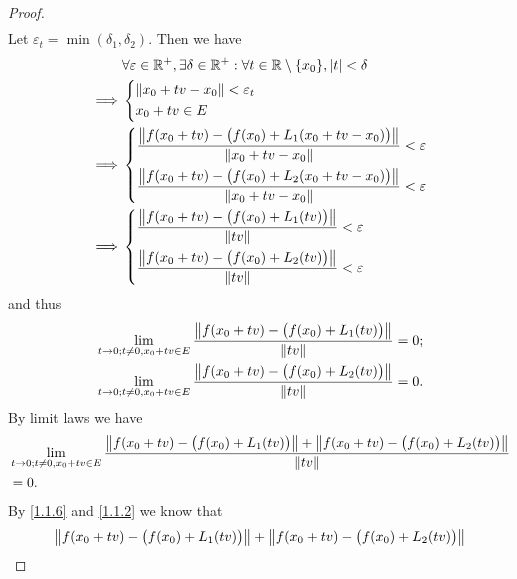 \begin{proof}
\begin{align*}
  \end{align*}
  Let \(\varepsilon_t = \min(\delta_1, \delta_2)\).
  Then we have
  \begin{align*}
             & \forall \varepsilon \in \R^+, \exists \delta \in \R^+ : \forall t \in \R \setminus \set{x_0}, \abs{t} < \delta \\
    \implies & \begin{dcases}
                 \norm*{x_0 + tv - x_0} < \varepsilon_t \\
                 x_0 + tv \in E
               \end{dcases}                                                                         \\
    \implies & \begin{dcases}
                 \dfrac{\norm*{f(x_0 + tv) - \big(f(x_0) + L_1(x_0 + tv - x_0)\big)}}{\norm*{x_0 + tv - x_0}} < \varepsilon \\
                 \dfrac{\norm*{f(x_0 + tv) - \big(f(x_0) + L_2(x_0 + tv - x_0)\big)}}{\norm*{x_0 + tv - x_0}} < \varepsilon
               \end{dcases}                                           \\
    \implies & \begin{dcases}
                 \dfrac{\norm*{f(x_0 + tv) - \big(f(x_0) + L_1(tv)\big)}}{\norm*{tv}} < \varepsilon \\
                 \dfrac{\norm*{f(x_0 + tv) - \big(f(x_0) + L_2(tv)\big)}}{\norm*{tv}} < \varepsilon
               \end{dcases}
  \end{align*}
  and thus
  \begin{align*}
     & \lim_{t \to 0 ; t \neq 0, x_0 + tv \in E} \dfrac{\norm*{f(x_0 + tv) - \big(f(x_0) + L_1(tv)\big)}}{\norm*{tv}} = 0; \\
     & \lim_{t \to 0 ; t \neq 0, x_0 + tv \in E} \dfrac{\norm*{f(x_0 + tv) - \big(f(x_0) + L_2(tv)\big)}}{\norm*{tv}} = 0.
  \end{align*}
  By limit laws we have
  \begin{align*}
     & \lim_{t \to 0 ; t \neq 0, x_0 + tv \in E} \dfrac{\norm*{f(x_0 + tv) - \big(f(x_0) + L_1(tv)\big)} + \norm*{f(x_0 + tv) - \big(f(x_0) + L_2(tv)\big)}}{\norm*{tv}} \\
     & = 0.
  \end{align*}
  By \cref{1.1.6} and \cref{1.1.2} we know that
  \begin{align*}
     & \norm*{f(x_0 + tv) - \big(f(x_0) + L_1(tv)\big)} + \norm*{f(x_0 + tv) - \big(f(x_0) + L_2(tv)\big)}   \\

\end{align*}
\end{proof}

